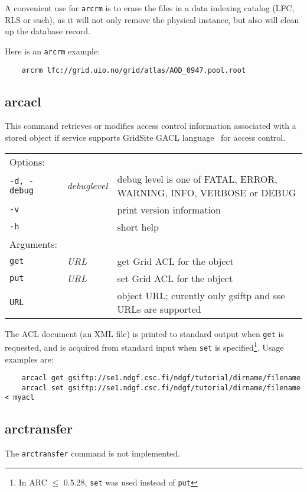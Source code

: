 \begin{framed}
   A convenient use for \texttt{arcrm} is to erase the files in a data
   indexing catalog (LFC, RLS or such), as it will not only remove the
   physical instance, but also will clean up the database record.
\end{framed}

Here is an \texttt{arcrm} example:

\begin{verbatim}
    arcrm lfc://grid.uio.no/grid/atlas/AOD_0947.pool.root
\end{verbatim}

\subsection{arcacl}\label{sec:arcacl}

This command retrieves or modifies
access control information associated with a stored object if service
supports GridSite GACL language~\cite{gacl} for access control.
\hspace*{0.5cm}
\begin{shaded}
\end{shaded}
\begin{longtable}{llp{8cm}}
   Options:&&\\
    \texttt{-d, -debug} & \textit{debuglevel} &debug level is one of  FATAL, ERROR, WARNING, INFO, VERBOSE or DEBUG\\
    \texttt{-v} && print version information\\
    \texttt{-h} && short help\\
   Arguments:&&\\
    \texttt{get} &\textit{URL}& get Grid ACL for the object\\
    \texttt{put} &\textit{URL}& set Grid ACL for the object\\
    \texttt{URL} && object URL; curently only gsiftp and sse URLs are supported\\
\end{longtable}

The ACL document (an XML file) is printed to standard output when
\texttt{get} is requested, and is acquired from standard input when
\texttt{set} is specified\footnote{In ARC $\leq$ 0.5.28, \texttt{set}
  was used instead of \texttt{put}}. Usage examples are:
\begin{verbatim}
    arcacl get gsiftp://se1.ndgf.csc.fi/ndgf/tutorial/dirname/filename
    arcacl set gsiftp://se1.ndgf.csc.fi/ndgf/tutorial/dirname/filename < myacl
\end{verbatim}

\subsection{arctransfer}\label{sec:arctransfer}
The \texttt{arctransfer} command is not implemented.


